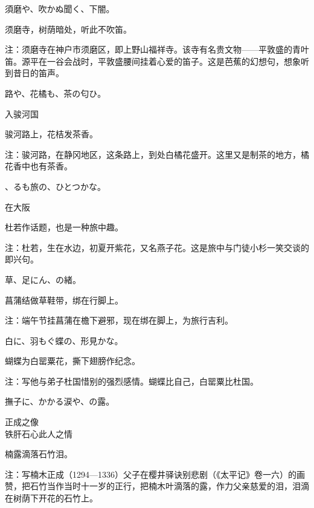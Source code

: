 \begin{haiku}
    {\FH 須磨や、吹かぬ聞く、下闇。}

    {\FK 须磨寺，树荫暗处，听此不吹笛。}

    {\FT 注：须磨寺在神户市须磨区，即上野山福祥寺。该寺有名贵文物——平敦盛的青叶笛。源平在一谷会战时，平敦盛腰间挂着心爱的笛子。这是芭蕉的幻想句，想象听到昔日的笛声。}
\end{haiku}

\begin{haiku}
    {\FH {}路や、花橘も、茶の匂ひ。}

    {\FK 入骏河国}

    {\FK 骏河路上，花桔发茶香。}

    {\FT 注：骏河路，在静冈地区，这条路上，到处白橘花盛开。这里又是制茶的地方，橘花香中也有茶香。}
\end{haiku}

\begin{haiku}
    {\FH {}、るも旅の、ひとつかな。}

    {\FK 在大阪}

    {\FK 杜若作话题，也是一种旅中趣。}

    {\FT 注：杜若，生在水边，初夏开紫花，又名燕子花。这是旅中与门徒小杉一笑交谈的即兴句。}
\end{haiku}

\begin{haiku}
    {\FH {}草、足にん、の緒。}

    {\FK 菖蒲结做草鞋带，绑在行脚上。}

    {\FT 注：端午节挂菖蒲在檐下避邪，现在绑在脚上，为旅行吉利。}
\end{haiku}

\begin{haiku}
    {\FH 白に、羽もぐ蝶の、形見かな。}

    {\FK 蝴蝶为白罂粟花，撕下翅膀作纪念。}

    {\FT 注：写他与弟子杜国惜别的强烈感情。蝴蝶比自己，白罂粟比杜国。}
\end{haiku}

\begin{haiku}
    {\FH 撫子に、かかる涙や、の露。}

    {\FK 正成之像\\铁肝石心此人之情}

    {\FK 楠露滴落石竹泪。}

    {\FT 注：写楠木正成（1294—1336）父子在樱井驿诀别悲剧（《太平记》卷一六）的画赞，把石竹当作当时十一岁的正行，把楠木叶滴落的露，作力父亲慈爱的泪，泪滴在树荫下开花的石竹上。}
\end{haiku}

